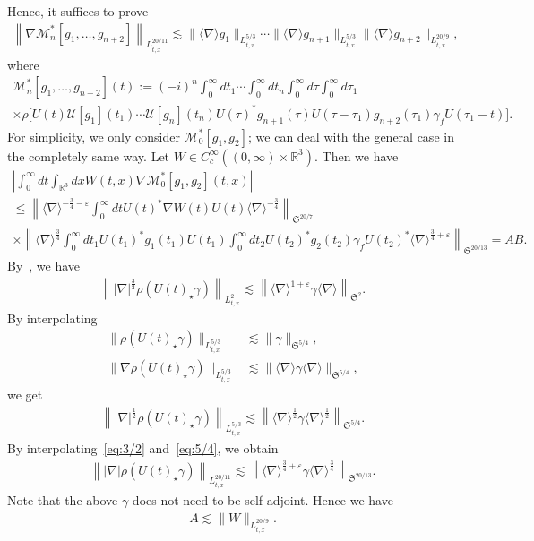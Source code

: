 \documentclass[AHL,Unicode,longabstracts,MathTools,published]{cedram}
\newcommand{\CM}{\mathcal{M}}
\newcommand{\CU}{\mathcal{U}}
\newcommand{\FS}{\mathfrak{S}}
\newcommand{\ga}{\gamma}
\newcommand{\ep}{\varepsilon}
\newcommand{\ta}{\tau}
\newcommand{\rh}{\rho}
\newcommand{\abs}[1]{\left|#1\right|}
\renewcommand{\No}[1]{\left\| #1 \right\|}
\newcommand{\I}{\infty}
\newcommand{\sd}{\langle \nabla \rangle}
\newcommand{\tx}{{t,x}}
\newcommand{\st}{\star}
\newcommand{\fh}{\frac{3}{4}}
\newcommand{\R}{\mathbb{R}}
\newcommand{\tw}{\frac{1}{2}}
\newcommand{\na}{\nabla}
\newcommand{\ls}{\lesssim}
\begin{document}
Hence, it suffices to prove
\begin{align}\label{eq:M}
\left\|\na\CM_n^*[g_1,\dots,g_{n+2}] \right\|_{L^{20/11}_\tx} \ls \|\sd g_1\|_{L^{5/3}_\tx}\cdots \|\sd g_{n+1}\|_{L^{5/3}_\tx} \|\sd g_{n+2}\|_{L^{20/9}_\tx},
\end{align}
where
\begin{multline}
\CM^*_n[g_1, \dots, g_{n+2}](t) := (-i)^{n} \int_0^\I dt_1 \cdots \int_0^\I dt_n \int_0^{\I} d\ta \int_0^\I d\ta_1 \\
 \times \rh \Big[U(t) \CU[g_1](t_1) \cdots \CU[g_n](t_n) U(\ta)^* g_{n+1}(\ta) U(\ta-\ta_1)g_{n+2}(\ta_1) \ga_f U(\ta_1-t) \Big].
\end{multline}
For simplicity, we only consider $\CM_0^*[g_1,g_2]$; we can deal with the general case in the completely same way. Let $W \in C_c^\I((0,\I)\times \R^3)$. Then we have
\begin{multline}
\abs{\int_0^\I dt \int_{\R^3} dx W(t,x) \na \CM_0^*[g_1,g_2](t,x) } \\
\le \No{\sd^{-\fh-\ep} \int_0^\I dt U(t)^* \na W(t) U(t)\sd^{-\fh} }_{\FS^{20/7}} \\
\times \No{\sd^{\fh} \int_0^\I dt_1 U(t_1)^* g_1(t_1) U(t_1) \int_0^\I dt_2 U(t_2)^* g_2(t_2)\ga_f U(t_2)^* \sd^{\fh+\ep} }_{\FS^{20/13}} = A B.
\end{multline}
By~\cite[Theorem~3.1]{2018CHP}, we have
\begin{align}\label{eq:3/2}
\left\||\na|^{\frac{3}{2}}\rh(U(t)_\st \ga)\right\|_{L^2_\tx} \ls \left\|\sd^{1+\ep} \ga \sd\right\|_{\FS^2}.
\end{align}
By interpolating
\begin{align}
\|\rh(U(t)_\st \ga)\|_{L^{5/3}_\tx} &\ls \|\ga\|_{\FS^{5/4}}, \\
\|\na \rh(U(t)_\st \ga)\|_{L^{5/3}_\tx} &\ls \|\sd \ga \sd\|_{\FS^{5/4}},
\end{align}
we get
\begin{align}\label{eq:5/4}
\left\||\na|^{\tw}\rh(U(t)_\st \ga)\right\|_{L^{5/3}_\tx} \ls \left\|\sd^\tw \ga \sd^\tw\right\|_{\FS^{5/4}}.
\end{align}
By interpolating~\eqref{eq:3/2} and~\eqref{eq:5/4}, we obtain
\begin{align}
\left\||\na| \rh(U(t)_\st \ga)\right\|_{L^{20/11}_\tx} \ls \left\|\sd^{\fh+\ep} \ga \sd^\fh\right\|_{\FS^{20/13}}.
\end{align}
Note that the above $\ga$ does not need to be self-adjoint. Hence we have
\begin{align}
A \ls \|W\|_{L^{20/9}_\tx}.
\end{align}
\end{document}
